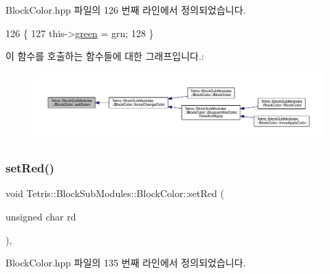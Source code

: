 Block\+Color.\+hpp 파일의 126 번째 라인에서 정의되었습니다.


\begin{DoxyCode}
126                                             \{
127                 this->\hyperlink{class_tetris_1_1_block_sub_modules_1_1_block_color_a4b28885bfd8bf53793c6b3daedd974eb}{green} = grn;
128             \}
\end{DoxyCode}
이 함수를 호출하는 함수들에 대한 그래프입니다.\+:
\nopagebreak
\begin{figure}[H]
\begin{center}
\leavevmode
\includegraphics[width=350pt]{de/d44/class_tetris_1_1_block_sub_modules_1_1_block_color_aeea8ab6d5f36d35fd4f28818349661ab_icgraph}
\end{center}
\end{figure}
\mbox{\label{class_tetris_1_1_block_sub_modules_1_1_block_color_a9541e6b5b809214ae2691a99af06ac3f}} 
\subsubsection{\texorpdfstring{set\+Red()}{setRed()}}
{\footnotesize\ttfamily void Tetris\+::\+Block\+Sub\+Modules\+::\+Block\+Color\+::set\+Red (\begin{DoxyParamCaption}\item[{unsigned char}]{rd }\end{DoxyParamCaption})\hspace{0.3cm}{\ttfamily [inline]}, {\ttfamily [protected]}}



Block\+Color.\+hpp 파일의 135 번째 라인에서 정의되었습니다.


